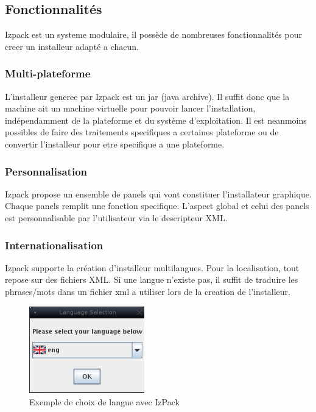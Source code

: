 \subsection{Fonctionnalités}
Izpack est un systeme modulaire, il possède de nombreuses fonctionnalités pour creer un installeur adapté a chacun.
\subsubsection{Multi-plateforme}
L'installeur generee par Izpack est un jar (java archive). Il suffit donc que la machine ait un machine virtuelle pour pouvoir lancer l'installation, indépendamment de la plateforme et du système d'exploitation. Il est neanmoins possibles de faire des traitements specifiques a certaines plateforme ou de convertir l'installeur pour etre specifique a une plateforme. 
\subsubsection{Personnalisation}
Izpack propose un ensemble de panels qui vont constituer l'installateur graphique. Chaque panels remplit une fonction specifique. L'aspect global et celui des panels est personnalisable par l'utilisateur via le descripteur XML.
\subsubsection{Internationalisation}
Izpack supporte la création d'installeur multilangues. Pour la localisation, tout repose sur des fichiers XML. Si une langue n'existe pas, il suffit de traduire les phrases/mots dans un fichier xml a utiliser lors de la creation de l'installeur.
\begin{figure}[H]
	\centering
	\includegraphics[width=5cm]{../image/LangChoice.png}
	\caption{Exemple de choix de langue avec IzPack}
\end{figure}
